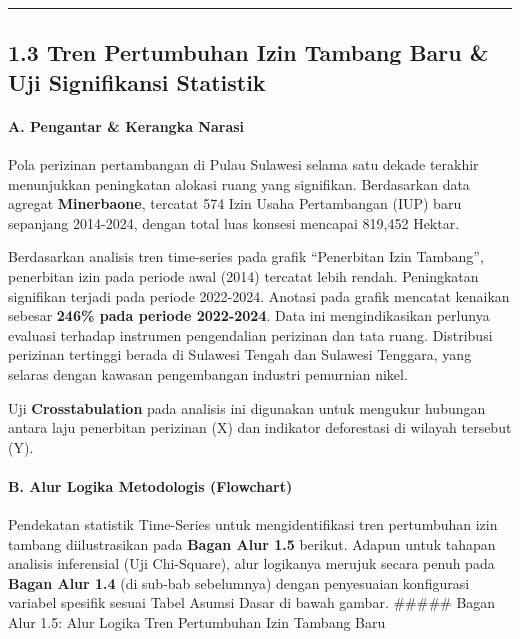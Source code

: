 \documentclass[
]{article}
\begin{document}
\begin{center}\rule{0.5\linewidth}{0.5pt}\end{center}

\subsection{1.3 Tren Pertumbuhan Izin Tambang Baru \& Uji Signifikansi
Statistik}\label{tren-pertumbuhan-izin-tambang-baru-uji-signifikansi-statistik}

\paragraph{A. Pengantar \& Kerangka
Narasi}\label{a.-pengantar-kerangka-narasi}

Pola perizinan pertambangan di Pulau Sulawesi selama satu dekade
terakhir menunjukkan peningkatan alokasi ruang yang signifikan.
Berdasarkan data agregat \textbf{Minerbaone}, tercatat 574 Izin Usaha
Pertambangan (IUP) baru sepanjang 2014-2024, dengan total luas konsesi
mencapai 819,452 Hektar.

Berdasarkan analisis tren time-series pada grafik ``Penerbitan Izin
Tambang'', penerbitan izin pada periode awal (2014) tercatat lebih
rendah. Peningkatan signifikan terjadi pada periode 2022-2024. Anotasi
pada grafik mencatat kenaikan sebesar \textbf{246\% pada periode
2022-2024}. Data ini mengindikasikan perlunya evaluasi terhadap
instrumen pengendalian perizinan dan tata ruang. Distribusi perizinan
tertinggi berada di Sulawesi Tengah dan Sulawesi Tenggara, yang selaras
dengan kawasan pengembangan industri pemurnian nikel.

Uji \textbf{Crosstabulation} pada analisis ini digunakan untuk mengukur
hubungan antara laju penerbitan perizinan (X) dan indikator deforestasi
di wilayah tersebut (Y).

\paragraph{B. Alur Logika Metodologis
(Flowchart)}\label{b.-alur-logika-metodologis-flowchart}

Pendekatan statistik Time-Series untuk mengidentifikasi tren pertumbuhan
izin tambang diilustrasikan pada \textbf{Bagan Alur 1.5} berikut. Adapun
untuk tahapan analisis inferensial (Uji Chi-Square), alur logikanya
merujuk secara penuh pada \textbf{Bagan Alur 1.4} (di sub-bab
sebelumnya) dengan penyesuaian konfigurasi variabel spesifik sesuai
Tabel Asumsi Dasar di bawah gambar. \#\#\#\#\# Bagan Alur 1.5: Alur
Logika Tren Pertumbuhan Izin Tambang Baru
\end{document}
